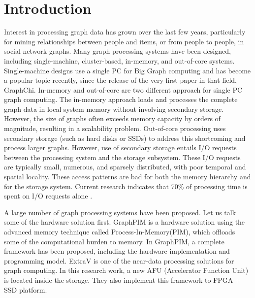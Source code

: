 
\section{Introduction}

Interest in processing graph data has grown over the last few years, particularly for mining relationships between people and items, or from people to people, in social network graphs. Many graph processing systems have been designed, including single-machine, cluster-based, in-memory, and out-of-core systems\cite{han2013turbograph,shun2013ligra,kyrola2012graphchi,gonzalez2012powergraph}. Single-machine designs use a single PC for Big Graph computing and has become a popular topic recently, since the release of the very first paper in that field, GraphChi\cite{kyrola2012graphchi}. In-memory and out-of-core are two different approach for single PC graph computing. The in-memory approach loads and processes the complete graph data in local system memory without involving secondary storage. However, the size of graphs often exceeds memory capacity by orders of magnitude, resulting in a scalability problem.  Out-of-core processing uses secondary storage (such as hard disks or SSDs) to address this shortcoming and process larger graphs.  However, use of secondary storage entails I/O requests between the processing system and the storage subsystem.   These I/O requests are typically small, numerous, and sparsely distributed, with poor temporal and spatial locality.  These access patterns are bad for both the memory hierarchy and for the storage system.  Current research indicates that 70\% of processing time is spent on I/O requests alone \cite{nai2015graphbig}.

A large number of graph processing systems have been proposed.  Let us talk some of the hardware solution first. GraphPIM\cite{nai2017graphpim} is a hardware solution using the advanced memory technique called Process-In-Memory(PIM), which offloads some of the computational burden to memory.  In GraphPIM, a complete framework has been proposed, including the hardware implementation and programming model. ExtraV\cite{lee2017extrav} is one of the near-data processing solutions for graph computing. In this research work, a new AFU (Accelerator Function Unit) is located inside the storage. They also implement this framework to FPGA + SSD platform.


